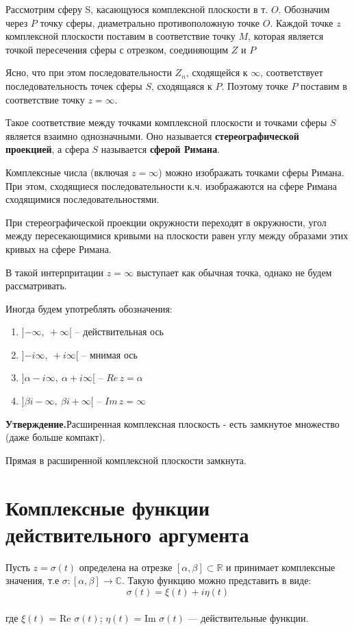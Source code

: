 \documentclass[a4paper, 12pt]{report}
\begin{document}
 Рассмотрим сферу S, касающуюся комплексной плоскости в т. $O$. Обозначим через $P$ точку сферы, диаметрально противоположную точке $O$. Каждой точке $z$ комплексной плоскости поставим в соответствие точку $M$, которая является точкой пересечения сферы с отрезком, соединяющим $Z$ и $P$
 
 Ясно, что при этом последовательности $Z_n$, сходящейся к $\infty$, соответствует последовательность точек сферы $S$, сходящаяся к $P$. Поэтому точке $P$ поставим в соответствие точку $z=\infty$.
  
 
 Такое соответствие между точками комплексной плоскости и точками сферы $S$ является взаимно однозначными. Оно называется \textbf{стереографической проекцией}, а сфера $S$ называется \textbf{сферой Римана}.
 \par\bigskip
 Комплексные числа (включая $z=\infty$) можно изображать точками сферы Римана. При этом, сходящиеся последовательности к.ч. изображаются на сфере Римана сходящимися последовательностями. 
 
 При стереографической проекции окружности переходят в окружности, угол между пересекающимися кривыми на плоскости равен углу между образами этих кривых на сфере Римана.
 
 В такой интерпритации $z=\infty$ выступает как обычная точка, однако  не будем рассматривать. 
 
 \par\bigskip
 Иногда будем употреблять обозначения:
  \begin{enumerate}
\item ]$-\infty,\ +\infty$[ -- действительная ось 
\item ]$-i\infty,\ +i\infty$[ -- мнимая ось
\item ]$\alpha-i\infty,\ \alpha+i\infty$[ -- $Re\,z=\alpha$
\item ]$\beta i-\infty,\ \beta i+\infty$[ -- $Im\, z=\infty$
\end{enumerate}

\textbf{Утверждение.}\quad Расширенная комплексная плоскость - есть замкнутое множество (даже больше компакт).

Прямая в расширенной комплексной плоскости замкнута.




\section{Комплексные функции действительного аргумента}
\par\bigskip
Пусть $z = \sigma (t)$ определена  на отрезке $[\alpha, \beta] \subset \mathbb {R} $ и принимает комплексные значения, т.е $\sigma: [\alpha, \beta] \to \mathbb{C}$. Такую функцию можно представить в виде:
\begin {equation}
\sigma (t) = \xi(t) + i \eta (t)
\end {equation}
\\где $\xi (t)$ = Re $\sigma (t)$; $\eta(t)$ = Im $ \sigma (t)$ --- действительные функции.
\end{document}
